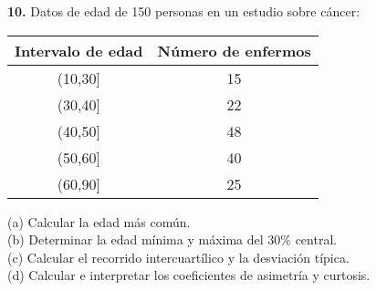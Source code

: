 \documentclass[a4paper,12pt]{article}
\begin{document}
\vspace{0.5cm}
\textbf{10.} Datos de edad de 150 personas en un estudio sobre cáncer:

\begin{center}
    \begin{tabular}{c|c}
        Intervalo de edad & Número de enfermos \\
        \hline
        (10,30] & 15 \\
        (30,40] & 22 \\
        (40,50] & 48 \\
        (50,60] & 40 \\
        (60,90] & 25 \\
    \end{tabular}
\end{center}

(a) Calcular la edad más común.\\
(b) Determinar la edad mínima y máxima del 30\% central.\\
(c) Calcular el recorrido intercuartílico y la desviación típica.\\
(d) Calcular e interpretar los coeficientes de asimetría y curtosis.
\end{document}
